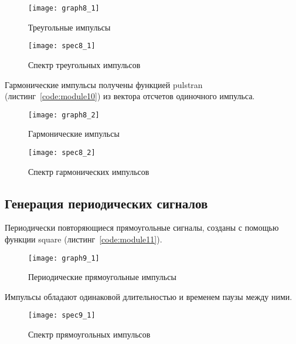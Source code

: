 \begin{figure}[H]
	\begin{center}
		\texttt{[image: graph8\_1]}
		\caption{Треугольные импульсы} 
		\label{pic:graph8_1} %
	\end{center}
\end{figure}
\begin{figure}[H]
	\begin{center}
		\texttt{[image: spec8\_1]}
		\caption{Спектр треугольных импульсов} 
		\label{pic:spec8_1} %
	\end{center}
\end{figure}

Гармонические импульсы получены функцией pulstran (листинг~\ref{code:module10}) из вектора отсчетов одиночного импульса.
\begin{figure}[H]
	\begin{center}
		\texttt{[image: graph8\_2]}
		\caption{Гармонические импульсы} 
		\label{pic:graph8_2} %
	\end{center}
\end{figure}

\begin{figure}[H]
	\begin{center}
		\texttt{[image: spec8\_2]}
		\caption{Спектр гармонических импульсов} 
		\label{pic:spec8_2} %
	\end{center}
\end{figure}

\subsection{Генерация периодических сигналов}

Периодически повторяющиеся прямоугольные сигналы, созданы с помощью функции square (листинг~\ref{code:module11}).

\begin{figure}[H]
	\begin{center}
		\texttt{[image: graph9\_1]}
		\caption{Периодические прямоугольные импульсы} 
		\label{pic:graph9_1} %
	\end{center}
\end{figure}

Импульсы обладают одинаковой длительностью и временем паузы между ними.

\begin{figure}[H]
	\begin{center}
		\texttt{[image: spec9\_1]}
		\caption{Спектр прямоугольных импульсов} 
		\label{pic:spec9_1} %
	\end{center}
\end{figure}

